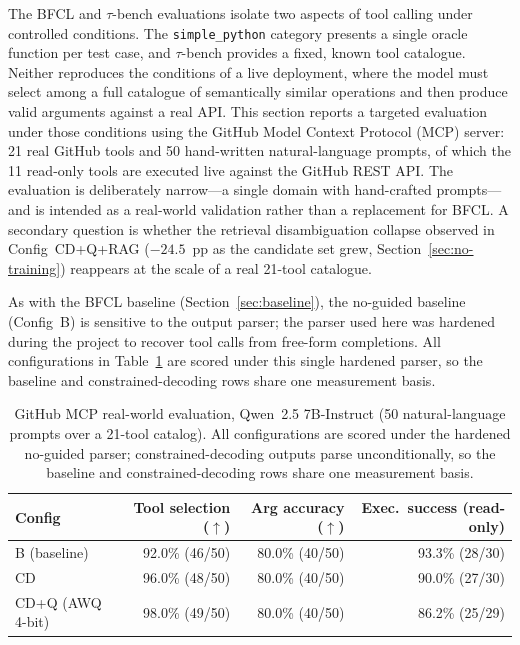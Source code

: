 The BFCL and $\tau$-bench evaluations isolate two aspects of tool calling under
controlled conditions. The \texttt{simple\_python} category presents a single
oracle function per test case, and $\tau$-bench provides a fixed, known tool
catalogue. Neither reproduces the conditions of a live deployment, where the
model must select among a full catalogue of semantically similar operations and
then produce valid arguments against a real API. This section reports a targeted
evaluation under those conditions using the GitHub Model Context Protocol (MCP)
server: 21 real GitHub tools and 50 hand-written natural-language prompts, of
which the 11 read-only tools are executed live against the GitHub REST API. The
evaluation is deliberately narrow---a single domain with hand-crafted
prompts---and is intended as a real-world validation rather than a replacement
for BFCL. A secondary question is whether the retrieval disambiguation collapse
observed in Config~CD+Q+RAG ($-24.5$~pp as the candidate set grew,
Section~\ref{sec:no-training}) reappears at the scale of a real 21-tool catalogue.

As with the BFCL baseline (Section~\ref{sec:baseline}), the no-guided baseline
(Config~B) is sensitive to the output parser; the parser used here was hardened
during the project to recover tool calls from free-form completions. All
configurations in Table~\ref{tab:github-mcp-qwen} are scored under this single
hardened parser, so the baseline and constrained-decoding rows share one
measurement basis.

\begin{table}[ht]
\centering
\caption{GitHub MCP real-world evaluation, Qwen~2.5 7B-Instruct (50 natural-language
prompts over a 21-tool catalog). All configurations are scored under the hardened
no-guided parser; constrained-decoding outputs parse unconditionally, so the
baseline and constrained-decoding rows share one measurement basis.}
\label{tab:github-mcp-qwen}
\begin{tabular}{lrrr}
\toprule
Config & Tool selection ($\uparrow$) & Arg accuracy ($\uparrow$) & Exec.\ success (read-only) \\
\midrule
B (baseline)        & 92.0\% (46/50) & 80.0\% (40/50) & 93.3\% (28/30) \\
CD                  & 96.0\% (48/50) & 80.0\% (40/50) & 90.0\% (27/30) \\
CD+Q (AWQ 4-bit)    & 98.0\% (49/50) & 80.0\% (40/50) & 86.2\% (25/29) \\
\bottomrule
\end{tabular}
\end{table}

